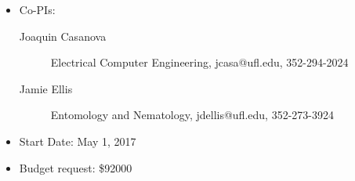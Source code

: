 
\begin{itemize}
\item Co-PIs:
\begin{description}
\item[Joaquin Casanova] Electrical Computer Engineering, jcasa@ufl.edu, 352-294-2024
\item[Jamie Ellis] Entomology and Nematology, jdellis@ufl.edu, 352-273-3924
\end{description}
\item Start Date: May 1, 2017
\item Budget request: \$92000
\end{itemize}
